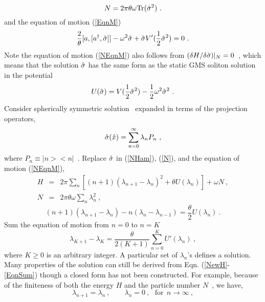 \documentclass[a4paper,a4paper]{article}
\def\Tr{{\hbox{Tr}}}
\begin{document}
\begin{equation}
N=2\pi\theta\omega\Tr(\hsigma^2)\ .\label{N}
\end{equation}
and the equation of motion (\ref{EqnM})
\begin{equation}
\frac 2\theta[a,[a^\dag,\hat{\sigma}]]-\omega^2\hat{\sigma}+\hat{\sigma} V'(\frac
12\hat{\sigma}^2)=0\ .\label{NEqnM}
\end{equation}
Note the equation of motion (\ref{NEqnM}) also follows from
$({\delta H}/{\delta \hat{\sigma}})|_N=0$\ , which means that
the solution $\hat{\sigma}$ has the same form as the static GMS soliton 
solution in the potential
\begin{equation}
U(\hat{\sigma})=V(\frac 12\hat{\sigma}^2)-\frac 12\omega^2\hat{\sigma}^2\ .                                    
\end{equation}
Consider spherically symmetric solution~\cite{GMS} expanded
in terms of the projection operators,
\begin{equation}
\hsigma(\hat{x})=\sum_{n=0}^\infty\lambda_nP_n\ ,                                             \label{SigmaExp}
\end{equation}
where $P_n\equiv|n><n|$\ .
Replace $\hat{\sigma}$ in (\ref{NHam}), (\ref{N}), and the equation of motion
(\ref{NEqnM}),
\begin{eqnarray}
H&=&2\pi\sum_n[(n+1)(\lambda_{n+1}-\lambda_{n})^2+\theta
U(\lambda_n)]+\omega N\ ,\label{NewH}\\
N&=&2\pi\theta\omega\sum_n\lambda_n^2\ ,\label{NewN}
\end{eqnarray}
\begin{equation}
(n+1)(\lambda_{n+1}-\lambda_n)-n(\lambda_n-\lambda_{n-1})=\frac \theta
2 U(\lambda_n)\ .\label{NewEqnM}
\end{equation}
Sum the equation of motion from $n=0$ to $n=K$
\begin{equation}
\lambda_{K+1}-\lambda_K=\frac\theta{2(K+1)}\sum_{n=0}^K U'(\lambda_n)\
, \label{EqnSum}
\end{equation}
where $K\geq 0$ is an arbitrary integer.  A particular set of
$\lambda_n$'s defines a solution. Many properties of the solution can
still be derived from Eqn. (\ref{NewH}-\ref{EqnSum}) though a closed
form has not been constructed.  For example, because of the
finiteness of both the energy $H$ and the particle number $N$\ , we have,
\begin{equation}
\lambda_{n+1}=\lambda_n\ ,\qquad \lambda_n=0\ ,~~~\mbox{for}~~
n\rightarrow \infty\ ,                                                                          \label{LambdaC}
\end{equation}
\end{document}
